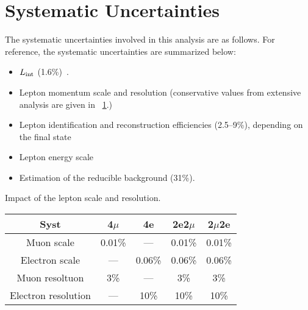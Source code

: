 \section{Systematic Uncertainties}
\label{sec:syst_uncert}
The systematic uncertainties involved in this analysis are as follows. %
For reference, the systematic uncertainties are summarized below:
\begin{itemize}
	\item $L_\text{int}$ (1.6\%)~\cite{LUM-17-003, LUM-18-002, LUM-17-004}.
	\item Lepton momentum scale and resolution (conservative values from extensive analysis are given in \tablename~\ref{table:ScaleRes_syst}.)
	\item Lepton identification and reconstruction efficiencies (2.5--9\%), depending on the final state %
	\item Lepton energy scale
	\item Estimation of the reducible background (31\%). %
\end{itemize}
\begin{table}[ht]
	\begin{center}
		\topcaption
		{Impact of the lepton scale and resolution.}
                \begin{tabular}{ccccc}
		\hline
		Syst	&	4$\mu$	&	4e	&	2e2$\mu$	&	2$\mu$2e	\\
		\hline
		Muon scale	&	0.01\%	&	---	&	0.01\%	&	0.01\%	\\
		Electron scale	&	---	&	0.06\%	&	0.06\%	&	0.06\%	\\
		\hline
		Muon resoltuon	&	3\%	&	---	&	3\%	&	3\%	\\
		Electron resolution	&	---	&	10\%	&       10\%&       10\%	\\
		\hline
		\end{tabular}
		\label{table:ScaleRes_syst}
	\end{center}
\end{table}

